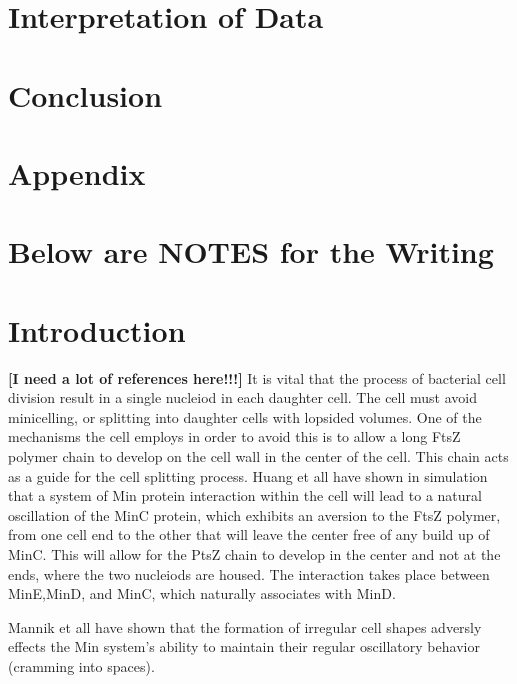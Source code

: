 \documentclass[letterpaper,twocolumn,amsmath,amssymb,pre]{revtex4-1}
\newcommand{\red}[1]{{\bf \color{red} #1}}
\newcommand{\fixme}[1]{\red{[#1]}}
\begin{document}
\section{Interpretation of Data}
\section{Conclusion}
\section*{Appendix}












\section{Below are NOTES for the Writing}













\section{Introduction}
\fixme{I need a lot of references here!!!}
It is vital that the process of bacterial cell division result in a single
nucleiod in each daughter cell.  The cell must avoid minicelling, or
splitting into daughter cells with lopsided volumes.  One of the mechanisms
the cell employs in order to avoid this is to allow a long FtsZ polymer
chain to develop on the cell wall in the center of the cell.  This chain
acts as a guide for the cell splitting process.  Huang et all have shown in
simulation that a system of Min protein interaction within the cell will
lead to a natural oscillation of the MinC protein, which exhibits an
aversion to the FtsZ polymer, from one cell end to the other that will
leave the center free of any build up of MinC.  This will allow for the
PtsZ chain to develop in the center and not at the ends, where the two
nucleiods are housed.  The interaction takes place between MinE,MinD, and
MinC, which naturally associates with MinD.

Mannik et all have shown that the formation of irregular cell shapes
adversly effects the Min system's ability to maintain their regular
oscillatory behavior (cramming into spaces).
\end{document}
